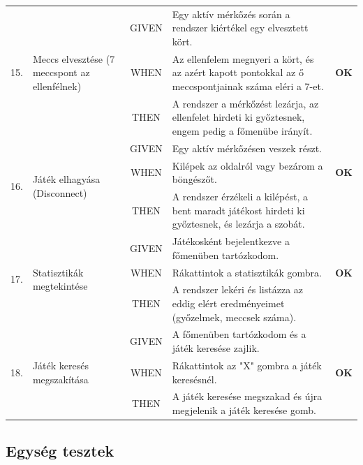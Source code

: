 \begin{longtable}{| c | m{3cm} | c | m{6cm} | c |}
    \multirow{3}{*}{15.} & \multirow{3}{3cm}{Meccs elvesztése (7 meccspont az ellenfélnek)} 
    & GIVEN & Egy aktív mérkőzés során a rendszer kiértékel egy elvesztett kört. & \cellcolor{green!40} \\* \cline{3-4}
    & & WHEN & Az ellenfelem megnyeri a kört, és az azért kapott pontokkal az ő meccspontjainak száma eléri a 7-et. & \cellcolor{green!40}\textbf{OK} \\* \cline{3-4}
    & & THEN & A rendszer a mérkőzést lezárja, az ellenfelet hirdeti ki győztesnek, engem pedig a főmenübe irányít. & \cellcolor{green!40} \\ \hline

    \multirow{3}{*}{16.} & \multirow{3}{3cm}{Játék elhagyása (Disconnect)} 
    & GIVEN & Egy aktív mérkőzésen veszek részt. & \cellcolor{green!40} \\* \cline{3-4}
    & & WHEN & Kilépek az oldalról vagy bezárom a böngészőt. & \cellcolor{green!40}\textbf{OK} \\* \cline{3-4}
    & & THEN & A rendszer érzékeli a kilépést, a bent maradt játékost hirdeti ki győztesnek, és lezárja a szobát. & \cellcolor{green!40} \\ \hline

    \multirow{3}{*}{17.} & \multirow{3}{3cm}{Statisztikák megtekintése} 
    & GIVEN & Játékosként bejelentkezve a főmenüben tartózkodom. & \cellcolor{green!40} \\* \cline{3-4}
    & & WHEN & Rákattintok a statisztikák gombra. & \cellcolor{green!40}\textbf{OK} \\* \cline{3-4}
    & & THEN & A rendszer lekéri és listázza az eddig elért eredményeimet (győzelmek, meccsek száma). & \cellcolor{green!40} \\ \hline

    \multirow{3}{*}{18.} & \multirow{3}{3cm}{Játék keresés megszakítása} 
    & GIVEN & A főmenüben tartózkodom és a játék keresése zajlik. & \cellcolor{green!40} \\* \cline{3-4}
    & & WHEN & Rákattintok az "X" gombra a játék keresésnél. & \cellcolor{green!40}\textbf{OK} \\* \cline{3-4}
    & & THEN & A játék keresése megszakad és újra megjelenik a játék keresése gomb. & \cellcolor{green!40} \\ \hline

\end{longtable}

\subsection{Egység tesztek}
\label{subsec:unit_tests}

